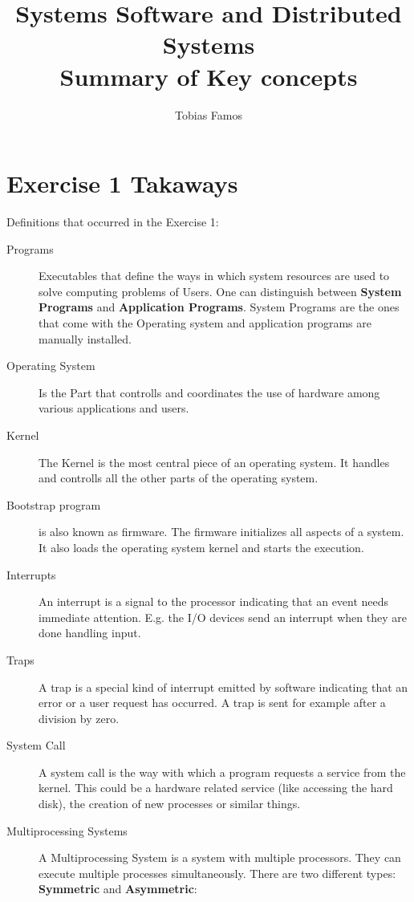 \documentclass{article}
\title{Systems Software and Distributed Systems \\
	Summary of Key concepts}
\author{Tobias Famos}
\begin{document}
 \maketitle
 	\section*{Exercise 1 Takaways}
 	Definitions that occurred in the Exercise 1: 
 		\begin{description}
			\item[Programs] Executables that define the ways in which system resources are used to solve computing problems of Users. One can distinguish between \textbf{System Programs} and \textbf{Application Programs}. System Programs are the ones that come with the Operating system and application programs are manually installed. 
			\item[Operating System] Is the Part that controlls and coordinates the use of hardware among various applications and users. 
			
			\item [Kernel] The Kernel is the most central piece of an operating system. It handles and controlls all the other parts of the operating system. 
			
			\item[Bootstrap program] is also known as firmware. The firmware initializes all aspects of a system. It also loads the operating system kernel and starts the execution.
			  
			\item[Interrupts] An interrupt is a signal to the processor indicating that an event needs immediate attention. E.g. the I/O devices send an interrupt when they are done handling input. 
			
 			\item[Traps] A trap is a special kind of interrupt emitted by software indicating that an error or a user request has occurred. A trap is sent for example after a division by zero. 
 			
 			\item[System Call] A system call is the way with which a program requests a service from the kernel. This could be a hardware related service (like accessing the hard disk), the creation of new processes or similar things. 
 			
			\item[Multiprocessing Systems] A Multiprocessing System is a system with multiple processors. They can execute multiple processes simultaneously. There are two different types: \textbf{Symmetric} and \textbf{Asymmetric}:
			

\end{description}
\end{document}
